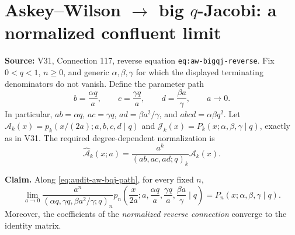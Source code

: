 \documentclass[11pt]{article}
\begin{document}
\section{Askey--Wilson $\to$ big $q$-Jacobi: a normalized confluent limit}
\noindent\textbf{Source:} V31, Connection 117, reverse equation \texttt{eq:aw-bigqj-reverse}. Fix $0<q<1$, $n\geq0$, and generic $\alpha,\beta,\gamma$ for which the displayed terminating denominators do not vanish. Define the parameter path
\begin{equation}
 b=\frac{\alpha q}{a},\qquad c=\frac{\gamma q}{a},\qquad d=\frac{\beta a}{\gamma},\qquad a\longrightarrow0.
 \label{eq:audit-aw-bqj-path}
\end{equation}
In particular, $ab=\alpha q$, $ac=\gamma q$, $ad=\beta a^2/\gamma$, and $abcd=\alpha\beta q^2$. Let $\mathcal A_k(x)=p_k(x/(2a);a,b,c,d\mid q)$ and $\mathcal J_k(x)=P_k(x;\alpha,\beta,\gamma\mid q)$, exactly as in V31. The required degree-dependent normalization is
\begin{equation}
\widehat{\mathcal A}_k(x;a)=\frac{a^k}{(ab,ac,ad;q)_k}\mathcal A_k(x).
\label{eq:audit-aw-bqj-norm}
\end{equation}
\par\noindent\textbf{Claim.} 
Along \eqref{eq:audit-aw-bqj-path}, for every fixed $n$,
\begin{equation}
\boxed{\displaystyle\lim_{a\to0}\frac{a^n}{(\alpha q,\gamma q,\beta a^2/\gamma;q)_n}
 p_n\!\left(\frac{x}{2a};a,\frac{\alpha q}{a},\frac{\gamma q}{a},\frac{\beta a}{\gamma}\mid q\right)
 =P_n(x;\alpha,\beta,\gamma\mid q).}
\label{eq:audit-aw-bqj-limit}
\end{equation}
Moreover, the coefficients of the \emph{normalized reverse connection} converge to the identity matrix.
\par
\end{document}
